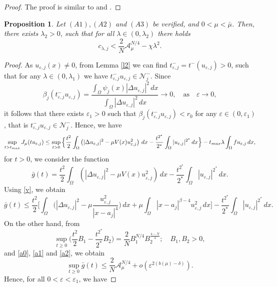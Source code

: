 \documentclass[10pt,a4paper]{amsart}
\numberwithin{equation}{section}
\newtheorem{proposition}[theorem]{Proposition}
\begin{document}
 \begin{proof}
 The proof is similar to \cite{j1} and \cite{K}.
 \end{proof}
 \begin{proposition}\label{PP}
 Let $(A1), (A2)$ and $(A3)$ be verified, and \(0<\mu<\bar{\mu}\). Then, there exists \(\lambda_2>0\), such that for all \(\lambda\in(0,\lambda_2)\) there holds
\begin{equation}\label{s3}
 c_{\lambda, j}<\frac{2}{N}\mathcal{A}_{\mu}^{N/4}-\chi \lambda^2.
\end{equation}
 \end{proposition}
 \begin{proof}
 As \(u_{\varepsilon, j}(x)\neq 0\), from Lemma \ref{l2} we can find 
 \(t_{\varepsilon, j}^-=t^-(u_{\varepsilon, j})>0\), such that for any 
 \(\lambda \in (0,\lambda_1)\) we have
  \(t_{\varepsilon, j}^-u_{\varepsilon, j}\in \mathcal{N}^-_j\). Since
 \[
 \beta_{j}(t_{\varepsilon, j}^-u_{\varepsilon, j})
 =\frac{\int_{\Omega}\psi_j(x)|\Delta u_{\varepsilon, j}|^2\,dx}
 {\int_{\Omega}|\Delta u_{\varepsilon, j}|^2\,dx}\to
 0, \quad\text{as}\quad \varepsilon\to 0,
 \]
it follows that there exists \(\varepsilon_1>0\) such that 
\(\beta_{j}(t_{\varepsilon, j}^-u_{\varepsilon, j})<r_0\) for any 
\(\varepsilon \in(0,\varepsilon_1)\), that is 
\(t_{\varepsilon, j}^-u_{\varepsilon, j}\in \mathcal{N}^-_j\). Hence, we have
\[
 \sup_{t> t_{\rm max}}J_{\mu}(tu_{\varepsilon, j})\leq \sup_{t>0}
 \Big\{ \frac{t^2}{2}\int_{\Omega}\left( |\Delta u_{\varepsilon, j}
 |^2-\mu V(x)u_{\varepsilon, j}^2\right)\,dx 
 -\frac{t^{2^*}}{2^*}\int_{\Omega}|u_{\varepsilon, j}|^{2^*}\,dx \Big\} 
  -t_{\rm max}\lambda \int_{\Omega}fu_{\varepsilon, j}\,dx,
\]
 for $t>0$, we consider the function
 \[
 \bar {g}(t)=\frac{t^2}{2}\int_{\Omega}\left( |\Delta u_{\varepsilon, j}|^2
 -\mu V(x)u_{\varepsilon, j}^2\right)\,dx
 -\frac{t^{2^*}}{2^*}\int_{\Omega}|u_{\varepsilon, j}|^{2^*}\,dx.
 \]
 Using \eqref{v}, we obtain
\[
 \bar {g}(t)\leq \frac{t^2}{2}\Big[ \int_{\Omega}\Big( |\Delta u_{\varepsilon, j}|^2
 -\mu \frac{u_{\varepsilon, j}^2}{|x-a_j|^4}\Big)\,dx
 +\mu \int_{\Omega}|x-a_j|^{\beta-4}u_{\varepsilon, j}^2\,dx\Big] 
  -\frac{t^{2^*}}{2^*}\int_{\Omega}|u_{\varepsilon, j}|^{2^*}\,dx.
\]
 On the other hand, from
 \[
 \sup_{t\geq 0}\Big( \frac{t^2}{2}B_1-\frac{t^{2^*}}{2^*}B_2\Big)
  =\frac{2}{N}B_1^{N/4}B_2^{\frac{4-N}{4}}; \quad  B_1, B_2>0,
 \]
 and  \eqref{a0}, \eqref{a1} and \eqref{a2}, we obtain
 \[
 \sup_{t\geq 0}\bar {g}(t)\leq \frac{2}{N}\mathcal{A}_{\mu}^{N/4}+o(\varepsilon^{2(b(\mu)-\delta)}).
 \]
Hence, for all \(0<\varepsilon<\varepsilon_1\), we have

\end{proof}
\end{document}
